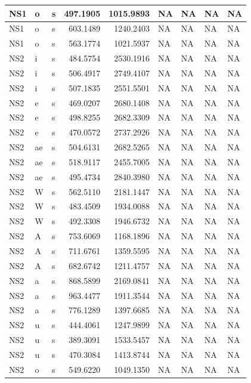 \documentclass[man, fleqn, noextraspace]{apa6}
\begin{document}
\begin{tabular}{l|l|l|r|r|l|l|l|l}
\hline
NS1 & o & s & 497.1905 & 1015.9893 & NA & NA & NA & NA\\
\hline
NS1 & o & s & 603.1489 & 1240.2403 & NA & NA & NA & NA\\
\hline
NS1 & o & s & 563.1774 & 1021.5937 & NA & NA & NA & NA\\
\hline
NS2 & i & s & 484.5754 & 2530.1916 & NA & NA & NA & NA\\
\hline
NS2 & i & s & 506.4917 & 2749.4107 & NA & NA & NA & NA\\
\hline
NS2 & i & s & 507.1835 & 2551.5501 & NA & NA & NA & NA\\
\hline
NS2 & e & s & 469.0207 & 2680.1408 & NA & NA & NA & NA\\
\hline
NS2 & e & s & 498.8255 & 2682.3309 & NA & NA & NA & NA\\
\hline
NS2 & e & s & 470.0572 & 2737.2926 & NA & NA & NA & NA\\
\hline
NS2 & ae & s & 504.6131 & 2682.5265 & NA & NA & NA & NA\\
\hline
NS2 & ae & s & 518.9117 & 2455.7005 & NA & NA & NA & NA\\
\hline
NS2 & ae & s & 495.4734 & 2840.3980 & NA & NA & NA & NA\\
\hline
NS2 & W & s & 562.5110 & 2181.1447 & NA & NA & NA & NA\\
\hline
NS2 & W & s & 483.4509 & 1934.0088 & NA & NA & NA & NA\\
\hline
NS2 & W & s & 492.3308 & 1946.6732 & NA & NA & NA & NA\\
\hline
NS2 & A & s & 753.6069 & 1168.1896 & NA & NA & NA & NA\\
\hline
NS2 & A & s & 711.6761 & 1359.5595 & NA & NA & NA & NA\\
\hline
NS2 & A & s & 682.6742 & 1211.4757 & NA & NA & NA & NA\\
\hline
NS2 & a & s & 868.5899 & 2169.0841 & NA & NA & NA & NA\\
\hline
NS2 & a & s & 963.4477 & 1911.3544 & NA & NA & NA & NA\\
\hline
NS2 & a & s & 776.1289 & 1397.6685 & NA & NA & NA & NA\\
\hline
NS2 & u & s & 444.4061 & 1247.9899 & NA & NA & NA & NA\\
\hline
NS2 & u & s & 389.3091 & 1533.5457 & NA & NA & NA & NA\\
\hline
NS2 & u & s & 470.3084 & 1413.8744 & NA & NA & NA & NA\\
\hline
NS2 & o & s & 549.6220 & 1049.1350 & NA & NA & NA & NA\\

\end{tabular}
\end{document}
